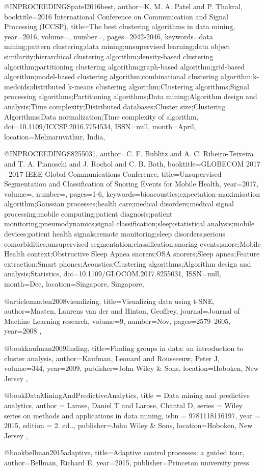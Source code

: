 @INPROCEEDINGS{patel2016best, 
author={K. M. A. {Patel} and P. {Thakral}}, 
booktitle={2016 International Conference on Communication and Signal Processing (ICCSP)}, 
title={The best clustering algorithms in data mining}, 
year={2016}, 
volume={}, 
number={}, 
pages={2042-2046}, 
keywords={data mining;pattern clustering;data mining;unsupervised learning;data object similarity;hierarchical clustering algorithm;density-based clustering algorithm;partitioning clustering algorithm;graph-based algorithm;grid-based algorithm;model-based clustering algorithm;combinational clustering algorithm;k-medoids;distributed k-means clustering algorithm;Clustering algorithms;Signal processing algorithms;Partitioning algorithms;Data mining;Algorithm design and analysis;Time complexity;Distributed databases;Cluster size;Clustering Algorithms;Data normalization;Time complexity of algorithm}, 
doi={10.1109/ICCSP.2016.7754534}, 
ISSN={null}, 
month={April},
location={Melmaruvathur, India},
}

@INPROCEEDINGS{8255031, 
author={C. F. {Bublitz} and A. C. {Ribeiro-Teixeira} and T. A. {Pianoschi} and J. {Rochol} and C. B. {Both}}, 
booktitle={GLOBECOM 2017 - 2017 IEEE Global Communications Conference}, 
title={Unsupervised Segmentation and Classification of Snoring Events for Mobile Health}, 
year={2017}, 
volume={}, 
number={}, 
pages={1-6}, 
keywords={bioacoustics;expectation-maximisation algorithm;Gaussian processes;health care;medical disorders;medical signal processing;mobile computing;patient diagnosis;patient monitoring;pneumodynamics;signal classification;sleep;statistical analysis;mobile devices;patient health signals;remote monitoring;sleep disorders;serious comorbidities;unsupervised segmentation;classification;snoring events;snore;Mobile Health context;Obstructive Sleep Apnea snorers;OSA snorers;Sleep apnea;Feature extraction;Smart phones;Acoustics;Clustering algorithms;Algorithm design and analysis;Statistics}, 
doi={10.1109/GLOCOM.2017.8255031}, 
ISSN={null}, 
month={Dec},
location={Singapore, Singapore}},

@article{maaten2008visualizing,
  title={Visualizing data using t-SNE},
  author={Maaten, Laurens van der and Hinton, Geoffrey},
  journal={Journal of Machine Learning research},
  volume={9},
  number={Nov},
  pages={2579--2605},
  year={2008}
},

@book{kaufman2009finding,
  title={Finding groups in data: an introduction to cluster analysis},
  author={Kaufman, Leonard and Rousseeuw, Peter J},
  volume={344},
  year={2009},
  publisher={John Wiley \& Sons},
  location={Hoboken, New Jersey}
},

@book{DataMiningAndPredictiveAnalytics,
title = {Data mining and predictive analytics},
author = {Larose, Daniel T and Larose, Chantal D},
series = {Wiley series on methods and applications in data mining},
isbn = {9781118116197},
year = {2015},
edition = {2. ed..},
publisher={John Wiley \& Sons},
location={Hoboken, New Jersey}
},

@book{bellman2015adaptive,
  title={Adaptive control processes: a guided tour},
  author={Bellman, Richard E},
  year={2015},
  publisher={Princeton university press}
}








